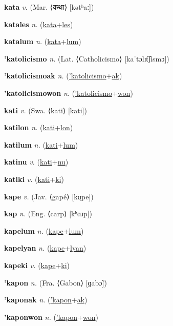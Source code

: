 \textbf{\hypertarget{kata}{kata}} \textit{v.} (Mar. ⟨{\devanagari{}कथा}⟩ [kətʰaː])


\textbf{\hypertarget{katales}{katales}} \textit{n.} (\hyperlink{kata}{kata}+\allowbreak \hyperlink{les}{les})


\textbf{\hypertarget{katalum}{katalum}} \textit{n.} (\hyperlink{kata}{kata}+\allowbreak \hyperlink{lum}{lum})


\textbf{\hypertarget{'katolicismo}{'katolicismo}} \textit{n.} (Lat. ⟨Catholicismo⟩ [kaˈtɔlɪt͡ʃismɔ])


\textbf{\hypertarget{'katolicismoak}{'katolicismoak}} \textit{n.} (\hyperlink{'katolicismo}{'katolicismo}+\allowbreak \hyperlink{ak}{ak})


\textbf{\hypertarget{'katolicismowon}{'katolicismowon}} \textit{n.} (\hyperlink{'katolicismo}{'katolicismo}+\allowbreak \hyperlink{won}{won})


\textbf{\hypertarget{kati}{kati}} \textit{v.} (Swa. ⟨kati⟩ [kati])


\textbf{\hypertarget{katilon}{katilon}} \textit{n.} (\hyperlink{kati}{kati}+\allowbreak \hyperlink{lon}{lon})


\textbf{\hypertarget{katilum}{katilum}} \textit{n.} (\hyperlink{kati}{kati}+\allowbreak \hyperlink{lum}{lum})


\textbf{\hypertarget{katinu}{katinu}} \textit{v.} (\hyperlink{kati}{kati}+\allowbreak \hyperlink{nu}{nu})


\textbf{\hypertarget{katiki}{katiki}} \textit{v.} (\hyperlink{kati}{kati}+\allowbreak \hyperlink{ki}{ki})


\textbf{\hypertarget{kape}{kape}} \textit{v.} (Jav. ⟨gapé⟩ [kɑ̤pe])


\textbf{\hypertarget{kap}{kap}} \textit{n.} (Eng. ⟨carp⟩ [kʰɑɹp])


\textbf{\hypertarget{kapelum}{kapelum}} \textit{n.} (\hyperlink{kape}{kape}+\allowbreak \hyperlink{lum}{lum})


\textbf{\hypertarget{kapelyan}{kapelyan}} \textit{n.} (\hyperlink{kape}{kape}+\allowbreak \hyperlink{lyan}{lyan})


\textbf{\hypertarget{kapeki}{kapeki}} \textit{v.} (\hyperlink{kape}{kape}+\allowbreak \hyperlink{ki}{ki})


\textbf{\hypertarget{'kapon}{'kapon}} \textit{n.} (Fra. ⟨Gabon⟩ [ɡabɔ̃])


\textbf{\hypertarget{'kaponak}{'kaponak}} \textit{n.} (\hyperlink{'kapon}{'kapon}+\allowbreak \hyperlink{ak}{ak})


\textbf{\hypertarget{'kaponwon}{'kaponwon}} \textit{n.} (\hyperlink{'kapon}{'kapon}+\allowbreak \hyperlink{won}{won})


